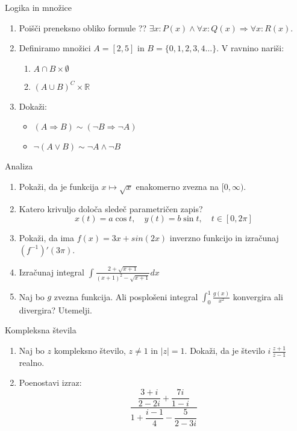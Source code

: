 
\begin{frame}{Logika in množice}
	\begin{enumerate}
		\item
		Poišči preneksno obliko formule ??
		$ \exists{x} : P(x) \land \forall{x} : Q(x) \Rightarrow \forall{x} : R(x)
		$.
		\item 
		Definiramo množici $A = [2,5]$ in $B = \{0,1,2,3,4\dots\}$.
		V ravnino nariši:
		\begin{enumerate}
		   \item $ A \cap B \times \emptyset $
		   \item $ (A \cup B)^C \times \mathbb{R} $
		\end{enumerate}
		\item
		Dokaži:
		\begin{itemize} 
			\item $ (A \Rightarrow B) \sim (\lnot B \Rightarrow \lnot A) $
			\item $ \lnot(A \lor B) \sim \lnot A \land \lnot B $
		\end{itemize}
	\end{enumerate}
\end{frame}

\begin{frame}{Analiza}
	\begin{enumerate}
		\item
		Pokaži, da je funkcija $ x \mapsto \sqrt{x} $ enakomerno zvezna na $ [0,\infty) $.
		\item 
		Katero krivuljo določa sledeč parametričen zapis?
		$$
		   x(t) = a \cos t, \quad  %
		   y(t) = b \sin t, \quad  %
		   t \in [0, 2 \pi]
		$$ 
		\item
		Pokaži, da ima $ f(x) = 3x + sin(2x) $ inverzno funkcijo in izračunaj $ (f^{-1})'(3\pi)$.
		
		\item
		Izračunaj integral 
		$ \displaystyle{ \int \frac{2+\sqrt{x+1}}{(x+1)^2-\sqrt{x+1}} dx }$
		\item 
		Naj bo $g$ zvezna funkcija. Ali posplošeni integral 
		$ \int_{0}^{1} \frac{g(x)}{x^2} $
		konvergira ali divergira? Utemelji.
	\end{enumerate}
\end{frame}

\begin{frame}{Kompleksna števila}
	\begin{enumerate}
		\item
		Naj bo $z$ kompleksno število, $z \ne 1$ in $ |z| = 1 $.
		Dokaži, da je število \( i \, \frac{z+1}{z-1} \) realno.
		\item
		Poenostavi izraz:
		$$  \dfrac{\dfrac{3+i}{2-2i}+\dfrac{7i}{1-i}}{1+\dfrac{i-1}{4}-\dfrac{5}{2-3i}} $$
	\end{enumerate}
\end{frame}